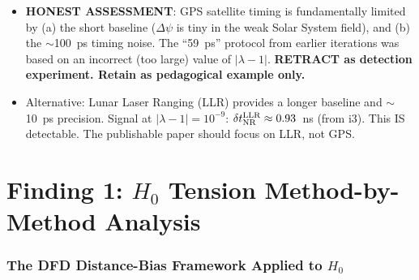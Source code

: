 \documentclass[11pt,a4paper]{article}
\newcommand{\Dpsi}{\Delta\psi}
\begin{document}
\begin{tcolorbox}[colback=yellow!5!white, colframe=red!70!black,
  title=\textbf{W4i17 TOP 5 FINDINGS --- RANKED BY IMPACT}]
\begin{enumerate}
\begin{itemize}[nosep]
  \item \textbf{HONEST ASSESSMENT}: GPS satellite timing is
    fundamentally limited by (a) the short baseline ($\Dpsi$
    is tiny in the weak Solar System field), and (b) the
    $\sim$100~ps timing noise. The ``59~ps'' protocol from
    earlier iterations was based on an incorrect (too large)
    value of $|\lambda - 1|$. \textbf{RETRACT as detection
    experiment. Retain as pedagogical example only.}
  \item Alternative: Lunar Laser Ranging (LLR) provides a
    longer baseline and $\sim$10~ps precision. Signal at
    $|\lambda - 1| = 10^{-9}$: $\delta t_{\rm NR}^{\rm LLR}
    \approx 0.93$~ns (from i3). This IS detectable.
    The publishable paper should focus on LLR, not GPS.
  \end{itemize}

\end{enumerate}

\end{tcolorbox}


\part{Finding 1: $H_0$ Tension Method-by-Method Analysis}
\label{sec:H0}

\section{The DFD Distance-Bias Framework Applied to $H_0$}
\end{document}
